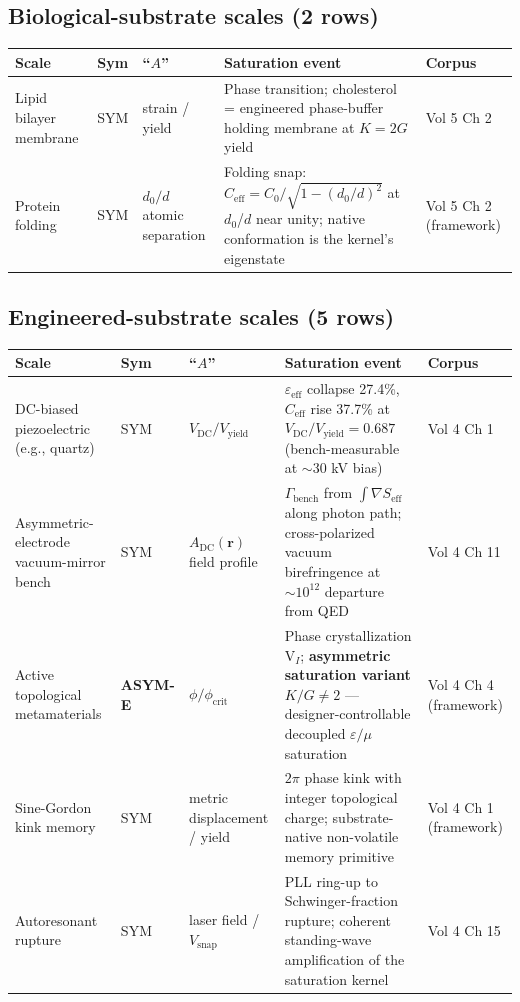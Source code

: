 \subsection{Biological-substrate scales (2 rows)}

\begin{center}
\renewcommand{\arraystretch}{1.4}
\scriptsize
\begin{tabular}{|p{2.4cm}|p{0.8cm}|p{2.8cm}|p{4.0cm}|p{3.2cm}|}
\hline
\textbf{Scale} & \textbf{Sym} & \textbf{``$A$''} & \textbf{Saturation event} & \textbf{Corpus} \\
\hline
Lipid bilayer membrane & SYM & strain / yield & Phase transition; cholesterol = engineered phase-buffer holding membrane at $K = 2G$ yield & Vol 5 Ch 2 \\
\hline
Protein folding & SYM & $d_0 / d$ atomic separation & Folding snap: $C_{\text{eff}} = C_0/\sqrt{1-(d_0/d)^2}$ at $d_0$/$d$ near unity; native conformation is the kernel's eigenstate & Vol 5 Ch 2 (framework) \\
\hline
\end{tabular}
\end{center}

\subsection{Engineered-substrate scales (5 rows)}

\begin{center}
\renewcommand{\arraystretch}{1.4}
\scriptsize
\begin{tabular}{|p{2.4cm}|p{0.8cm}|p{2.7cm}|p{4.2cm}|p{3.0cm}|}
\hline
\textbf{Scale} & \textbf{Sym} & \textbf{``$A$''} & \textbf{Saturation event} & \textbf{Corpus} \\
\hline
DC-biased piezoelectric (e.g., quartz) & SYM & $V_{\text{DC}}/V_{\text{yield}}$ & $\varepsilon_{\text{eff}}$ collapse 27.4\%, $C_{\text{eff}}$ rise 37.7\% at $V_{\text{DC}}/V_{\text{yield}} = 0.687$ (bench-measurable at $\sim$30 kV bias) & Vol 4 Ch 1 \\
\hline
Asymmetric-electrode vacuum-mirror bench & SYM & $A_{\text{DC}}(\mathbf{r})$ field profile & $\Gamma_{\text{bench}}$ from $\int \nabla S_{\text{eff}}$ along photon path; cross-polarized vacuum birefringence at $\sim 10^{12}$ departure from QED & Vol 4 Ch 11 \\
\hline
Active topological metamaterials & \textbf{ASYM-E} & $\phi / \phi_{\text{crit}}$ & Phase crystallization V$_I$; \textbf{asymmetric saturation variant} $K/G \neq 2$ --- designer-controllable decoupled $\varepsilon/\mu$ saturation & Vol 4 Ch 4 (framework) \\
\hline
Sine-Gordon kink memory & SYM & metric displacement / yield & $2\pi$ phase kink with integer topological charge; substrate-native non-volatile memory primitive & Vol 4 Ch 1 (framework) \\
\hline
Autoresonant rupture & SYM & laser field / $V_{\text{snap}}$ & PLL ring-up to Schwinger-fraction rupture; coherent standing-wave amplification of the saturation kernel & Vol 4 Ch 15 \\
\hline
\end{tabular}
\end{center}

